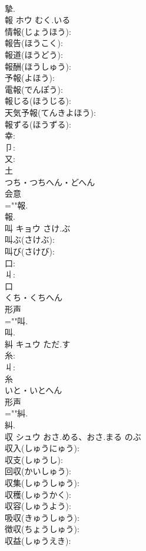 \documentclass[8pt]{extreport}
\begin{document}
\begin{CJK}{UTF8}{min}
\\	摯.
\\	報	ホウ	むく.いる		
\\	情報(じょうほう): 
\\	報告(ほうこく): 
\\	報道(ほうどう): 
\\	報酬(ほうしゅう): 
\\	予報(よほう): 
\\	電報(でんぽう): 
\\	報じる(ほうじる): 
\\	天気予報(てんきよほう): 
\\	報ずる(ほうずる): 
\\	幸: 
\\	卩: 
\\	又: 
\\	土	
\\	つち・つちへん・どへん	
\\	会意 
\\	=""報.
\\	報.
\\	叫	キョウ	さけ.ぶ		
\\	叫ぶ(さけぶ): 
\\	叫び(さけび): 
\\	口: 
\\	丩: 
\\	口	
\\	くち・くちへん	
\\	形声 
\\	=""叫.
\\	叫.
\\	糾	キュウ	ただ.す		
\\	糸: 
\\	丩: 
\\	糸	
\\	いと・いとへん	
\\	形声 
\\	=""糾.
\\	糾.
\\	収	シュウ	おさ.める、おさ.まる	のぶ	
\\	収入(しゅうにゅう): 
\\	収支(しゅうし): 
\\	回収(かいしゅう): 
\\	収集(しゅうしゅう): 
\\	収穫(しゅうかく): 
\\	収容(しゅうよう): 
\\	吸収(きゅうしゅう): 
\\	徴収(ちょうしゅう): 
\\	収益(しゅうえき): 

\end{CJK}
\end{document}
